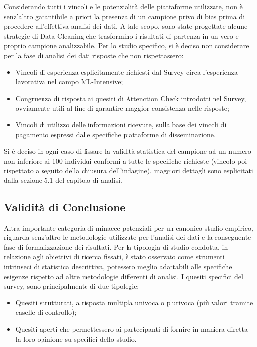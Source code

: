 Considerando tutti i vincoli e le potenzialità delle piattaforme utilizzate, non è senz'altro garantibile a priori la presenza di un campione privo di bias prima di procedere all'effettiva analisi dei dati. A tale scopo, sono state progettate alcune strategie di Data Cleaning che trasformino i risultati di partenza in un vero e proprio campione analizzabile. Per lo studio specifico, si è deciso non considerare per la fase di analisi dei dati risposte che non rispettassero:
\begin{itemize}
    \item Vincoli di esperienza esplicitamente richiesti dal Survey circa l'esperienza lavorativa nel campo ML-Intensive;
    \item Congruenza di risposta ai quesiti di Attenction Check introdotti nel Survey, ovviamente utili al fine di garantire maggior consistenza nelle risposte;
    \item Vincoli di utilizzo delle informazioni ricevute, sulla base dei vincoli di pagamento espressi dalle specifiche piattaforme di disseminazione.
\end{itemize}

Si è deciso in ogni caso di fissare la validità statistica del campione ad un numero non inferiore ai 100 individui conformi a tutte le specifiche richieste (vincolo poi rispettato a seguito della chiusura dell'indagine), maggiori dettagli sono esplicitati dalla sezione 5.1 del capitolo di analisi.
\subsection{Validità di Conclusione}

Altra importante categoria di minacce potenziali per un canonico studio empirico, riguarda senz'altro le metodologie utilizzate per l'analisi dei dati e la conseguente fase di formalizzazione dei risultati. Per la tipologia di studio condotta, in relazione agli obiettivi di ricerca fissati, è stato osservato come strumenti intrinseci di statistica descrittiva, potessero meglio adattabili alle specifiche esigenze rispetto ad altre metodologie differenti di analisi. I quesiti specifici del survey, sono principalmente di due tipologie:
\begin{itemize}
    \item Quesiti strutturati, a risposta multipla univoca o plurivoca (più valori tramite caselle di controllo);
    \item Quesiti aperti che permettessero ai partecipanti di fornire in maniera diretta la loro opinione su specifici dello studio.
\end{itemize}

